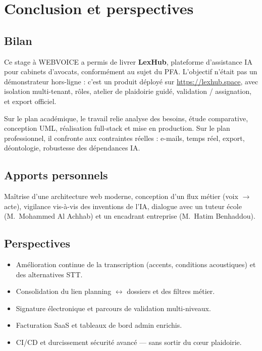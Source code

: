 \chapter{Conclusion et perspectives}
\label{ch:conclusion}

\section{Bilan}

Ce stage à WEBVOICE a permis de livrer \textbf{LexHub}, plateforme d'assistance IA pour cabinets d'avocats, conformément au sujet du PFA. L'objectif n'était pas un démonstrateur hors-ligne : c'est un produit déployé sur \url{https://lexhub.space}, avec isolation multi-tenant, rôles, atelier de plaidoirie guidé, validation / assignation, et export officiel.

Sur le plan académique, le travail relie analyse des besoins, étude comparative, conception UML, réalisation full-stack et mise en production. Sur le plan professionnel, il confronte aux contraintes réelles : e-mails, temps réel, export, déontologie, robustesse des dépendances IA.

\section{Apports personnels}

Maîtrise d'une architecture web moderne, conception d'un flux métier (voix $\rightarrow$ acte), vigilance vis-à-vis des inventions de l'IA, dialogue avec un tuteur école (M.~Mohammed Al Achhab) et un encadrant entreprise (M.~Hatim Benhaddou).

\section{Perspectives}

\begin{itemize}[leftmargin=1.4em]
  \item Amélioration continue de la transcription (accents, conditions acoustiques) et des alternatives STT.
  \item Consolidation du lien planning $\leftrightarrow$ dossiers et des filtres métier.
  \item Signature électronique et parcours de validation multi-niveaux.
  \item Facturation SaaS et tableaux de bord admin enrichis.
  \item CI/CD et durcissement sécurité avancé --- sans sortir du cœur plaidoirie.
\end{itemize}

